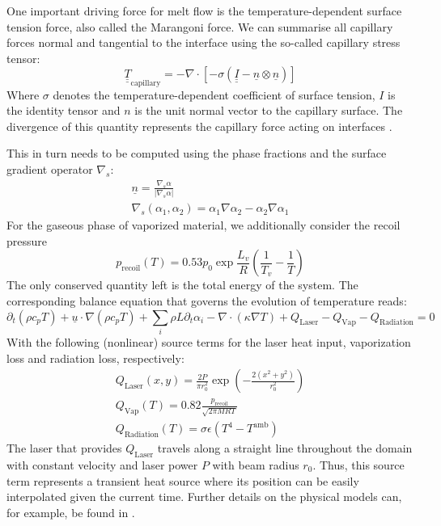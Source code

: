 \documentclass[asi,article,submit,moreauthors]{Definitions/mdpi}
\begin{document}
One important driving force for melt flow is the temperature-dependent surface tension force, also called the Marangoni force.
We can summarise all capillary forces normal and tangential to the interface using the so-called capillary stress tensor:
\begin{equation}\label{eq:capillary-stress}
    \underline{\underline{T}}_\text{capillary} = - \nabla \cdot \left[-\sigma (\underline{\underline{I}} - \underline{n} \otimes \underline{n}) \right]
\end{equation}
Where $\sigma$ denotes the temperature-dependent coefficient of surface tension, $I$ is the identity tensor and $n$ is the unit normal vector to the capillary surface.
The divergence of this quantity represents the capillary force acting on interfaces \cite{brackbillContinuumMethodModeling1992}.

This in turn needs to be computed using the phase fractions and the surface gradient operator $\nabla_s$:
\begin{align}
    \underline{n} = \frac{\nabla_s \alpha}{\lvert \nabla_s \alpha \rvert} \label{eq:unit-normal} \\
    \nabla_s(\alpha_1,\alpha_2) = \alpha_1 \nabla \alpha_2 - \alpha_2 \nabla \alpha_1 \label{eq:interface-gradient}
\end{align}
For the gaseous phase of vaporized material, we additionally consider the recoil pressure
\begin{equation}\label{eq:recoil-pressure}
    p_\text{recoil}(T) = 0.53 p_0 \exp{\frac{L_v}{R} \left( \frac{1}{T_v}-\frac{1}{T} \right)}
\end{equation}
The only conserved quantity left is the total energy of the system.
The corresponding balance equation that governs the evolution of temperature reads:
\begin{equation}\label{eq:heat-balance}
    \partial_t (\rho c_p T) + \underline{u} \cdot \nabla (\rho c_p T) + \sum_i \rho L \partial_t \alpha_i - \nabla \cdot (\kappa \nabla T)  + Q_\text{Laser} - Q_\text{Vap} - Q_\text{Radiation} = 0
\end{equation}
With the following (nonlinear) source terms for the laser heat input, vaporization loss and radiation loss, respectively:
\begin{align}
    Q_\text{Laser}(x,y) = \frac{2P}{\pi r_0^2} \exp \left( - \frac{2(x^2+y^2)}{r_0^2}\right) \label{eq:laser-heat}\\
    Q_\text{Vap}(T) = 0.82 \frac{p_\text{recoil}}{\sqrt{2\pi MRT}} \label{eq:vapor-heat} \\
    Q_\text{Radiation}(T) = \sigma \epsilon (T^4 - T^\text{amb}) \label{eq:radiation-heat}
\end{align}
The laser that provides $Q_\text{Laser}$ travels along a straight line throughout the domain with constant velocity and laser power $P$ with beam radius $r_0$.
Thus, this source term represents a transient heat source where its position can be easily interpolated given the current time.
Further details on the physical models can, for example,  be found in \cite{zimbrodEfficientSimulationComplex2022}.
\end{document}
